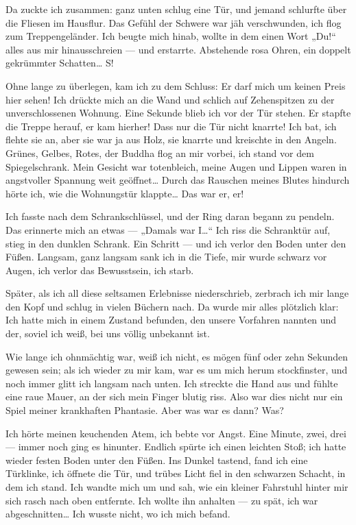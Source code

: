 Da zuckte ich zusammen: ganz unten schlug eine Tür, und jemand
schlurfte über die Fliesen im Hausflur. Das Gefühl der Schwere war
jäh verschwunden, ich flog zum Treppengeländer. Ich beugte mich
hinab, wollte in dem einen Wort „Du!“ alles aus mir hinausschreien
— und erstarrte. Abstehende rosa Ohren, ein doppelt gekrümmter
Schatten\ldots{} S!

Ohne lange zu überlegen, kam ich zu dem Schluss: Er darf mich um
keinen Preis hier sehen! Ich drückte mich an die Wand und schlich
auf Zehenspitzen zu der unverschlossenen Wohnung. Eine Sekunde
blieb ich vor der Tür stehen. Er stapfte die Treppe herauf, er kam
hierher! Dass nur die Tür nicht knarrte! Ich bat, ich flehte sie
an, aber sie
war ja aus Holz, sie knarrte und kreischte in den Angeln. Grünes,
Gelbes, Rotes, der Buddha flog an mir vorbei, ich stand vor dem
Spiegelschrank. Mein Gesicht war totenbleich, meine Augen und
Lippen waren in angstvoller Spannung weit geöffnet\ldots{} Durch das
Rauschen meines Blutes hindurch hörte ich, wie die Wohnungstür
klappte\ldots{} Das war er, er!

Ich fasste nach dem Schrankschlüssel, und der Ring daran begann zu
pendeln. Das erinnerte mich an etwas — „Damals war I\ldots{}“ Ich riss
die Schranktür auf, stieg in den dunklen Schrank. Ein Schritt — und
ich verlor den Boden unter den Füßen. Langsam, ganz langsam sank
ich in die Tiefe, mir wurde schwarz vor Augen, ich verlor das
Bewusstsein, ich starb.

Später, als ich all diese seltsamen Erlebnisse niederschrieb,
zerbrach ich mir lange den Kopf und schlug in vielen Büchern nach.
Da wurde mir alles plötzlich klar: Ich hatte mich in einem Zustand
befunden, den unsere Vorfahren  nannten und der, soviel ich
weiß, bei uns völlig unbekannt ist.

Wie lange ich ohnmächtig war, weiß ich nicht, es mögen fünf oder
zehn Sekunden gewesen sein; als ich wieder zu mir kam, war es um
mich herum stockfinster, und noch immer glitt ich langsam nach
unten. Ich streckte die Hand aus und fühlte eine raue Mauer, an der
sich mein Finger blutig riss. Also war dies nicht nur ein Spiel
meiner krankhaften Phantasie. Aber was war es dann? Was?

Ich hörte
meinen keuchenden Atem, ich bebte vor Angst. Eine Minute, zwei,
drei — immer noch ging es hinunter. Endlich spürte ich einen
leichten Stoß; ich hatte wieder festen Boden unter den Füßen. Ins
Dunkel tastend, fand ich eine Türklinke, ich öffnete die Tür, und
trübes Licht fiel in den schwarzen Schacht, in dem ich stand. Ich
wandte mich um und sah, wie ein kleiner Fahrstuhl hinter mir sich
rasch nach oben entfernte. Ich wollte ihn anhalten — zu spät, ich
war abgeschnitten\ldots{} Ich wusste nicht, wo ich mich befand.

